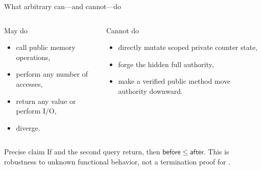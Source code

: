 \documentclass[aspectratio=169,10pt]{beamer}
\newcommand{\code}[1]{\texttt{\detokenize{#1}}}
\begin{document}
\begin{frame}{What arbitrary \code{f} can---and cannot---do}
  \begin{columns}[T,onlytextwidth]
      \begin{exampleblock}{May do}
        \begin{itemize}
          \item call public memory operations,
          \item perform any number of accesses,
          \item return any value or perform I/O,
          \item diverge.
        \end{itemize}
      \end{exampleblock}
      \begin{alertblock}{Cannot do}
        \begin{itemize}
          \item directly mutate scoped private counter state,
          \item forge the hidden full authority,
          \item make a verified public method move authority downward.
        \end{itemize}
      \end{alertblock}
  \end{columns}

  \vspace{0.45cm}
  \begin{block}{Precise claim}
    If \code{f} and the second query return, then \(\mathsf{before}\le\mathsf{after}\). This is robustness to unknown functional behavior, not a termination proof for \code{f}.
  \end{block}
\end{frame}
\end{document}
